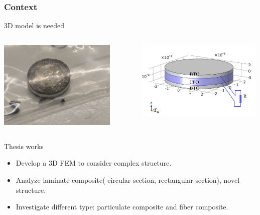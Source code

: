 \documentclass[compress]{beamer}
\begin{document}
\begin{frame}\frametitle{Context}
\vspace{-10.5pt}
\begin{alertblock}{3D model is needed}
\begin{columns}[totalwidth=\textwidth] 
   \begin{column}{.5\textwidth}
   \raggedleft
\includegraphics[width=0.83\textwidth]{Graphic/01_photoMEcircle.png}
	\end{column}
	\begin{column}{.5\textwidth}
	\includegraphics[width=0.99\textwidth]{Graphic/01_geoMEcircu.pdf}
	\end{column}
\end{columns}
\end{alertblock}
\begin{exampleblock}{Thesis works} 
  \begin{itemize}[label=$\bullet$, font=\small, leftmargin=*]
	\item Develop a 3D FEM to consider complex structure.
	\item Analyze laminate composite( circular section, rectangular section), novel structure.
	\item Investigate different type: particulate composite and fiber composite.
	\end{itemize}
\end{exampleblock}	
\end{frame}
\end{document}
